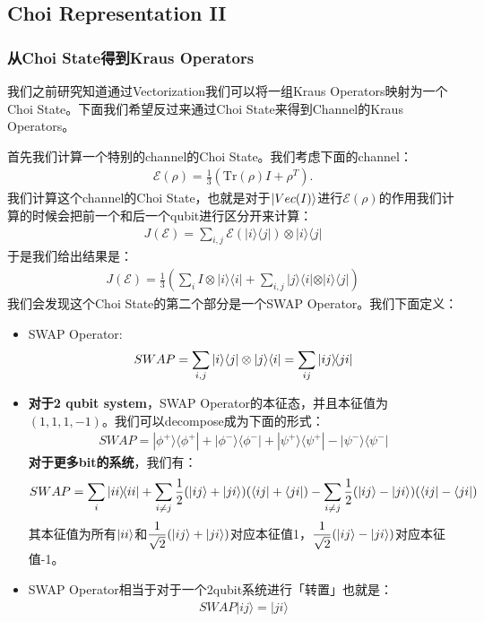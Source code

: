 \subsection{Choi Representation II}

\subsubsection{从Choi State得到Kraus Operators}\label{sec:from-choi-to-kraus}

我们之前研究知道通过Vectorization我们可以将一组Kraus Operators映射为一个Choi State。下面我们希望反过来通过Choi State来得到Channel的Kraus Operators。

\bigskip
{}

首先我们计算一个特别的channel的Choi State。我们考虑下面的channel：
\begin{align}
  \mathcal{E}(\rho)=\frac{1}{3}\left(\mathrm{Tr}(\rho)I+\rho^T\right).
\end{align}
我们计算这个channel的Choi State，也就是对于$ \left| Vec(I) \right\rangle $进行$ \mathcal{E}(\rho) $的作用我们计算的时候会把前一个和后一个qubit进行区分开来计算：
\begin{align}
  J(\mathcal{E})=\sum_{i,j}\mathcal{E}(|i\rangle\langle j|)\otimes|i\rangle\langle j|
\end{align}
于是我们给出结果是：
\begin{align}
  J(\mathcal{E}) = \frac{1}{3}\left(\sum_iI\otimes|i\rangle\langle i|+\sum_{i, j}\lvert j\rangle\langle i|\otimes|i\rangle\langle j|\right)
\end{align}
我们会发现这个Choi State的第二个部分是一个SWAP Operator。我们下面定义：
\begin{itemize}
  \item SWAP Operator:
    \begin{align}
      SWAP=\sum_{i,j}|i\rangle\langle j|\otimes|j\rangle\langle i| = \sum_{ij} \left| ij \middle\rangle\!\middle\langle ji \right|
    \end{align}
  \item \textbf{对于2 qubit system}，SWAP Operator的本征态，并且本征值为$ (1,1,1,-1) $。我们可以decompose成为下面的形式：
      \begin{align}
        SWAP = | \phi^+ \rangle \langle \phi^+ | + | \phi^- \rangle \langle \phi^- | + | \psi^+ \rangle \langle \psi^+ | - | \psi^- \rangle \langle \psi^- |
      \end{align}
      \textbf{对于更多bit的系统}，我们有：
      \begin{align}
        SWAP = \sum_i \left| ii \middle\rangle\!\middle\langle ii \right| + \sum_{i \neq j} \displaystyle\frac{1}{2} (\left| ij \right\rangle + \left| ji \right\rangle)(\langle ij| + \langle ji|) - \sum_{i \neq j} \displaystyle\frac{1}{2} (\left| ij \right\rangle - \left| ji \right\rangle)(\langle ij| - \langle ji|)
      \end{align}
      其本征值为所有$ \left| ii \right\rangle $和$ \displaystyle\frac{1}{\sqrt{2}}(\left| ij \right\rangle+\left| ji \right\rangle) $对应本征值1，$ \displaystyle\frac{1}{\sqrt{2}}(\left| ij \right\rangle-\left| ji \right\rangle) $对应本征值-1。
    \item SWAP Operator相当于对于一个2qubit系统进行「转置」也就是：
\begin{align}
  SWAP|ij\rangle=|ji\rangle
\end{align}
\end{itemize}
